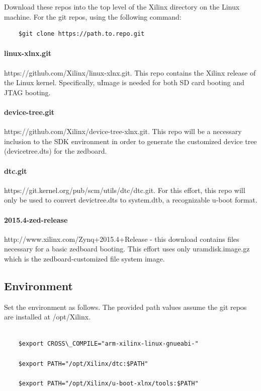 \documentclass[12pt]{article}
\begin{document}
Download these repos into the top level of the Xilinx directory on the Linux machine.  For the git repos, using the following command:

\begin{lstlisting}
	$git clone https://path.to.repo.git
\end{lstlisting}

\paragraph*{linux-xlnx.git}\label{par:linux-xlnx}https://github.com/Xilinx/linux-xlnx.git.  This repo contains the Xilinx release of the Linux kernel.  Specifically, uImage is needed for both SD card booting and JTAG booting.
\paragraph*{device-tree.git}\label{par:devicetree}https://github.com/Xilinx/device-tree-xlnx.git. This repo will be a necessary inclusion to the SDK environment in order to generate the customized device tree (devicetree.dts) for the zedboard.
\paragraph*{dtc.git}\label{par:dtc}https://git.kernel.org/pub/scm/utils/dtc/dtc.git.  For this effort, this repo will only be used to convert devictree.dts to system.dtb, a recognizable u-boot format.
\paragraph*{2015.4-zed-release}\label{par:zed}http://www.xilinx.com/Zynq+2015.4+Release - this download contains files necessary for a basic zedboard booting.  This effort uses only uramdisk.image.gz which is the zedboard-customized file system image.

\subsection{Environment}
\label{subsec:environment}
Set the environment as follows.  The provided path values assume the git repos are installed at /opt/Xilinx.
\begin{lstlisting}

	$export CROSS\_COMPILE="arm-xilinx-linux-gnueabi-"

	$export PATH="/opt/Xilinx/dtc:$PATH"

	$export PATH="/opt/Xilinx/u-boot-xlnx/tools:$PATH"
\end{lstlisting}
\end{document}
